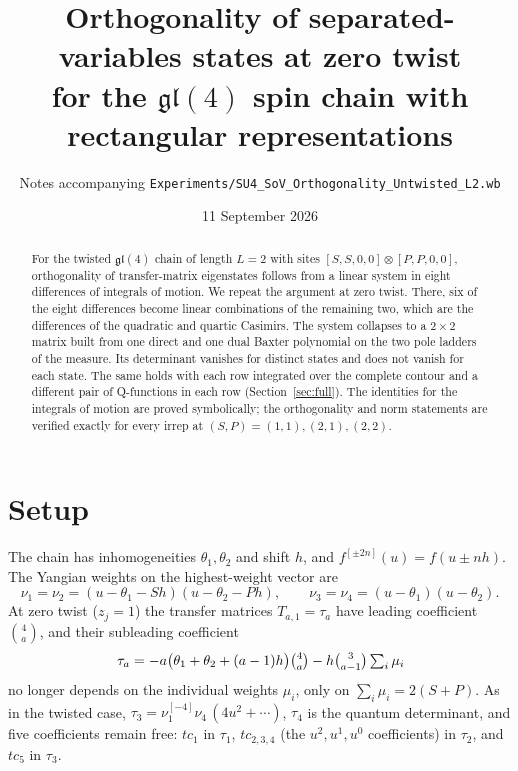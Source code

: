 \documentclass[11pt]{article}
\title{Orthogonality of separated-variables states at zero twist\\
for the $\mathfrak{gl}(4)$ spin chain with rectangular representations}
\author{Notes accompanying \texttt{Experiments/SU4\_SoV\_Orthogonality\_Untwisted\_L2.wb}}
\date{11 September 2026}
\newcommand{\shift}[1]{^{[#1]}}
\begin{document}
\maketitle

\begin{abstract}
For the twisted $\mathfrak{gl}(4)$ chain of length $L=2$ with sites $[S,S,0,0]\otimes[P,P,0,0]$,
orthogonality of transfer-matrix eigenstates follows from a linear system in eight differences of
integrals of motion. We repeat the argument at zero twist. There, six of the eight differences
become linear combinations of the remaining two, which are the differences of the quadratic and
quartic Casimirs. The system collapses to a $2\times2$ matrix built from one direct and one dual
Baxter polynomial on the two pole ladders of the measure. Its determinant vanishes for distinct
states and does not vanish for each state. The same holds with each row integrated over the
complete contour and a different pair of Q-functions in each row (Section~\ref{sec:full}). The
identities for the integrals of motion are proved
symbolically; the orthogonality and norm statements are verified exactly for every irrep at
$(S,P)=(1,1),(2,1),(2,2)$.
\end{abstract}

\section{Setup}

The chain has inhomogeneities $\theta_1,\theta_2$ and shift $h$, and $f\shift{\pm 2n}(u)=f(u\pm nh)$.
The Yangian weights on the highest-weight vector are
\begin{equation}
\nu_1=\nu_2=(u-\theta_1-Sh)(u-\theta_2-Ph),\qquad \nu_3=\nu_4=(u-\theta_1)(u-\theta_2).
\end{equation}
At zero twist ($z_j=1$) the transfer matrices $T_{a,1}=\tau_a$ have leading coefficient
$\binom{4}{a}$, and their subleading coefficient
\begin{equation}
[u^{2a-1}]\,\tau_a = -a\big(\theta_1+\theta_2+(a-1)h\big)\tbinom{4}{a} - h\tbinom{3}{a-1}\textstyle\sum_i\mu_i
\label{eq:subl}
\end{equation}
no longer depends on the individual weights $\mu_i$, only on $\sum_i\mu_i=2(S+P)$. As in the twisted
case, $\tau_3=\nu_1\shift{-4}\nu_4\,(4u^2+\cdots)$, $\tau_4$ is the quantum determinant, and five
coefficients remain free: $tc_1$ in $\tau_1$, $tc_{2,3,4}$ (the $u^2,u^1,u^0$ coefficients) in
$\tau_2$, and $tc_5$ in $\tau_3$.
\end{document}
